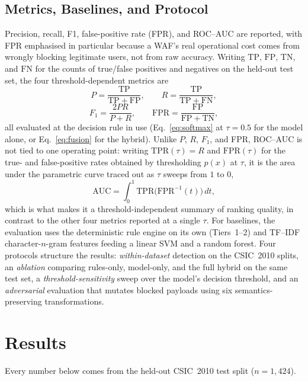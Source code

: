 \documentclass[conference]{IEEEtran}
\begin{document}
\subsection{Metrics, Baselines, and Protocol}
Precision, recall, F1, false-positive rate (FPR), and
ROC--AUC are reported, with FPR emphasised in particular because a WAF's real
operational cost comes from wrongly blocking legitimate users, not from
raw accuracy. Writing $\mathrm{TP}$, $\mathrm{FP}$, $\mathrm{TN}$, and
$\mathrm{FN}$ for the counts of true/false positives and negatives on the
held-out test set, the four threshold-dependent metrics are
\begin{equation}
P=\frac{\mathrm{TP}}{\mathrm{TP}+\mathrm{FP}}, \qquad
R=\frac{\mathrm{TP}}{\mathrm{TP}+\mathrm{FN}},
\label{eq:pr}
\end{equation}
\begin{equation}
F_1=\frac{2PR}{P+R}, \qquad
\mathrm{FPR}=\frac{\mathrm{FP}}{\mathrm{FP}+\mathrm{TN}},
\label{eq:f1fpr}
\end{equation}
all evaluated at the decision rule in use (Eq.~\eqref{eq:softmax} at
$\tau=0.5$ for the model alone, or Eq.~\eqref{eq:fusion} for the
hybrid). Unlike $P$, $R$, $F_1$, and FPR, ROC--AUC is not tied to one
operating point: writing $\mathrm{TPR}(\tau)=R$ and $\mathrm{FPR}(\tau)$
for the true- and false-positive rates obtained by thresholding
$p(x)$ at $\tau$, it is the area under the parametric curve traced out
as $\tau$ sweeps from $1$ to $0$,
\begin{equation}
\mathrm{AUC} = \int_0^1 \mathrm{TPR}\bigl(\mathrm{FPR}^{-1}(t)\bigr)\,dt,
\label{eq:auc}
\end{equation}
which is what makes it a threshold-independent summary of ranking
quality, in contrast to the other four metrics reported at a single
$\tau$. For baselines, the evaluation
uses the deterministic rule engine on its own (Tiers~1--2) and TF--IDF
character-$n$-gram features feeding a linear SVM and a random forest.
Four protocols structure the results:
\emph{within-dataset} detection on the CSIC~2010 splits, an
\emph{ablation} comparing rules-only, model-only, and the full hybrid on
the same test set, a \emph{threshold-sensitivity} sweep over the model's
decision threshold, and an \emph{adversarial} evaluation that mutates
blocked payloads using six semantics-preserving transformations.

\section{Results}
Every number below comes from the held-out CSIC~2010 test split
($n=1{,}424$).
\end{document}
